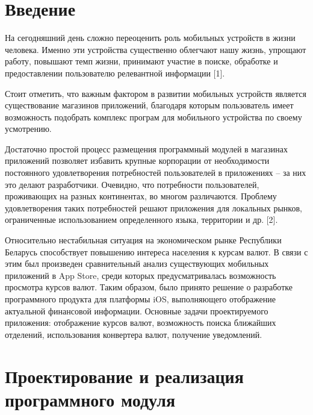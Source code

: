 \documentclass[a4paper,11pt,twoside]{article}
\begin{document}



\begin{multicols}{2}

\section*{Введение}

На сегодняшний день сложно переоценить роль мобильных устройств в жизни человека.
Именно эти устройства существенно облегчают нашу жизнь, упрощают работу,
повышают темп жизни, принимают участие в поиске, обработке и предоставлении
пользователю релевантной информации [1].

Стоит отметить, что важным фактором в развитии мобильных устройств является
существование магазинов приложений, благодаря которым пользователь имеет
возможность подобрать комплекс програм для мобильного устройства по своему усмотрению.

Достаточно простой процесс размещения программный модулей в магазинах приложений
позволяет избавить крупные корпорации от необходимости постоянного удовлетворения
потребностей пользователей в приложениях -- за них это делают разработчики.
Очевидно, что потребности пользователей, проживающих на разных континентах,
во многом различаются.
Проблему удовлетворения таких потребностей решают приложения для локальных рынков,
ограниченные использованием определенного языка, территории и др. [2].

Относительно нестабильная ситуация на экономическом рынке Республики Беларусь
способствует повышению интереса населения к курсам валют. В связи с этим был
произведен сравнительный анализ существующих мобильных приложений в App Store,
среди которых предусматривалась возможность просмотра курсов валют.
Таким образом, было принято решение о разработке программного
продукта для платформы iOS, выполняющего отображение актуальной финансовой
информации. Основные задачи проектируемого приложения: отображение курсов валют,
возможность поиска ближайших отделений, использования конвертера валют,
получение уведомлений.

\section{Проектирование и реализация программного модуля}


\end{multicols}
\end{document}
